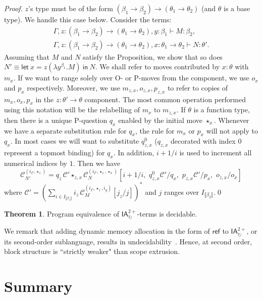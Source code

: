 \documentclass{CSML}
\theoremstyle{definition}\newtheorem{definition}[thm]{Definition}
\theoremstyle{definition}\newtheorem{example}[thm]{Example}
\theoremstyle{definition}\newtheorem{proposition}[thm]{Proposition}
\theoremstyle{definition}\newtheorem{lemma}[thm]{Lemma}
\theoremstyle{definition}\newtheorem{theorem}[thm]{Theorem}
\theoremstyle{definition}\newtheorem{corollary}[thm]{Corollary}
\theoremstyle{definition}\newtheorem{remark}[thm]{Remark}
\newcommand\clg[1]{\mathcal{#1}}
\newcommand\compi[2]{\mathcal{C}_{#1}^{#2}}
\newcommand\ialoop{\mathsf{IA}_{\circlearrowright}}
\newcommand\iatwo{\ialoop^{2+}}
\newcommand\letin[2]{\mathsf{let}\ #1\ \mathsf{in}\ #2}
\newcommand{\rarr}{\rightarrow}
\newcommand\sem[1]{\llbracket #1 \rrbracket}
\newcommand\seq[2]{{#1} \vdash {#2}}
\newcommand\newc{\mathsf{ref}}
\begin{document}
\begin{proof}
{$z$'s type must be of the form $(\beta_1\rarr\beta_2)\rarr(\theta_1\rarr\theta_2)$ (and $\theta$ is a base type).
We handle this case below. Consider the terms:
\[\begin{array}{l}
\seq{\Gamma,z:(\beta_1\rarr\beta_2)\rarr(\theta_1\rarr\theta_2), y:\beta_1}{M:\beta_2},\\
\seq{\Gamma,z:(\beta_1\rarr\beta_2)\rarr(\theta_1\rarr\theta_2),x:\theta_1\rarr\theta_2}{N:\theta'}.
\end{array}\]
Assuming that $M$ and $N$ satisfy the Proposition, we show that so does 
$N'\equiv\letin{x=z(\lambda y^{\beta_1}.M)}{N}$.
We shall refer to moves contributed by $x:\theta$ with $m_x$.
If we want to range solely over O- or P-moves from the component, we use $o_x$ and $p_x$ respectively.
Moreover, we use $m_{z,x}, o_{z,x}, p_{z,x}$ to refer to copies of $m_x, o_x, p_x$ in the $z:\theta'\rarr\theta$ component.
The most common operation performed using this notation will be the relabelling of $m_x$ to $m_{z,x}$.
If $\theta$ is a function type, then there is a unique P-question $q_x$ enabled by the initial move $\star_x$.
Whenever we have a separate substitution rule for $q_x$, the rule for $m_x$ or $p_x$ will not apply to $q_x$.
In most cases we will want to substitute $q_{z,x}^0$ ($q_{z,x}$ decorated with index $0$ represent a topmost binding) for $q_x$.
In addition, $i+1/i$ is used to increment all numerical indices by $1$.
Then we have
\[
\compi{N'}{(i_\Gamma,\star_z)} = q_z\, \clg{C}' \star_{z,x}  \compi{N}{(i_\Gamma,\star_z,\star_x)}[i+1/i,\,\, q_{z,x}^0\clg{C}'/q_x,\,\, 
p_{z,x}\clg{C}'/p_x,\,\, o_{z,x}/o_x]
\]
where $\clg{C}'=(\sum_{i\in I_{\sem{\beta_1}}} i_z\, \compi{M}{(i_\Gamma,\star_z,i_y)}[ j_z/j] )^\ast$ and $j$ ranges over $I_{\sem{\beta_2}}$.\qed}
\end{proof}
\begin{theorem}
Program equivalence of $\iatwo$-terms is decidable.
\end{theorem}
We remark that adding dynamic memory allocation in the form of $\newc$ to $\iatwo$,
or its second-order sublanguage, results in undecidability~\cite{Mur04b}. Hence,
at second order, block structure is ``strictly weaker" than scope extrusion.

\section{Summary}
\end{document}
